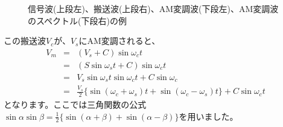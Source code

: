 \begin{figure}
\caption{信号波(上段左)、搬送波(上段右)、AM変調波(下段左)、AM変調波のスペクトル(下段右)の例}
\end{figure}

この搬送波$V_c$が、$V_s$にAM変調されると、
\begin{eqnarray}
V_m &=& (V_s + C)\sin\omega_ct \label{eq:AM}\\ 
&=&(S\sin\omega_s t + C)\sin\omega_c t \nonumber \\
&=& V_s\sin\omega_s t \sin\omega_c t + C\sin\omega_c \nonumber \\
&=& \frac{V_s}{2}\{\sin(\omega_c + \omega_s)t + \sin(\omega_c - \omega_s)t\} + C\sin\omega_ct \label{eq:AM_exp}
\end{eqnarray}
となります。ここでは三角関数の公式$\sin\alpha\sin\beta=\frac{1}{2}\{\sin(\alpha+\beta)+\sin(\alpha-\beta)\}$を用いました。

